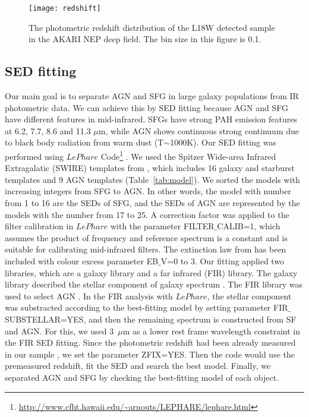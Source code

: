 \documentclass[a4paper,fleqn,usenatbib]{mnras}
\begin{document}
\begin{figure}
	\texttt{[image: redshift]}
    \caption{The photometric redshift distribution of the L18W detected sample in the AKARI NEP deep field. The bin size in this figure is 0.1.}
    \label{fig:redshift}
\end{figure}


\subsection{SED fitting}
\label{SED}
Our main goal is to separate AGN and SFG in large galaxy populations from IR photometric data. We can achieve this by SED fitting because AGN and SFG have different features in mid-infrared. SFGs have strong PAH emission features at 6.2, 7.7, 8.6 and 11.3 $\mu$m, while AGN shows continuous strong continuum due to black body radiation from warm dust (T$\sim$1000K). Our SED fitting was performed using $LePhare$ Code\footnote{\url{http://www.cfht.hawaii.edu/~arnouts/LEPHARE/lephare.html}} \citep{Arnouts et al. 1999}. We used the Spitzer Wide-area Infrared Extragalatic (SWIRE) templates from \citet{Polletta et al. 2007}, which includes 16 galaxy and starburst templates and 9 AGN templates (Table~\ref{tab:model}). We sorted the models with increasing integers from SFG to AGN. In other words, the model with number from 1 to 16 are the SEDs of SFG, and the SEDs of AGN are represented by the models with the number from 17 to 25. A correction factor was applied to the filter calibration in $LePhare$ with the parameter FILTER$\_$CALIB=1, which assumes the product of frequency and reference spectrum is a constant and is suitable for calibrating mid-infrared filters. The extinction law from \citet{Calzetti et al. 2000} has been included with colour excess parameter EB$\_$V=0 to 3. Our fitting applied two libraries, which are a galaxy library and a far infrared (FIR) library. The galaxy library described the stellar component of galaxy spectrum \citep[][CWW-Kinney throughout this paper]{Coleman et al. 1980,Kinney et al. 1996}. The FIR library was used to select AGN \citep{Polletta et al. 2007}. In the FIR analysis with $LePhare$, the stellar component was substracted according to the best-fitting model by setting parameter FIR$\_$SUBSTELLAR=YES, and then the remaining spectrum is constructed from SF and AGN. For this, we used 3~$\mu$m as a lower rest frame wavelength constraint in the FIR SED fitting.  Since the photometric redshift had been already measured in our sample \citep{Oi et al. 2014}, we set the parameter ZFIX=YES. Then the code would use the premeasured redshift, fit the SED and search the best model. Finally, we separated AGN and SFG by checking the best-fitting model of each object.
\end{document}
